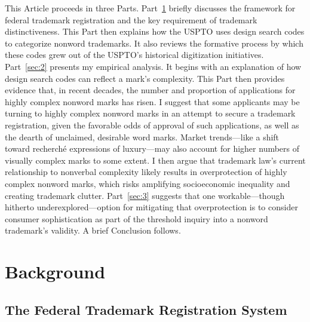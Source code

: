 \documentclass[letterpaper, 11pt, oneside]{article}
\begin{document}
This Article proceeds in three Parts. Part~\ref{sec:1} briefly discusses the framework for federal trademark registration and the key requirement of trademark distinctiveness. This Part then explains how the USPTO uses design search codes to categorize nonword trademarks. It also reviews the formative process by which these codes grew out of the USPTO's historical digitization initiatives. Part~\ref{sec:2} presents my empirical analysis. It begins with an explanation of how design search codes can reflect a mark's complexity. This Part then provides evidence that, in recent decades, the number and proportion of applications for highly complex nonword marks has risen. I suggest that some applicants may be turning to highly complex nonword marks in an attempt to secure a trademark registration, given the favorable odds of approval of such applications, as well as the dearth of unclaimed, desirable word marks. Market trends—like a shift toward recherché expressions of luxury—may also account for higher numbers of visually complex marks to some extent. I then argue that trademark law's current relationship to nonverbal complexity likely results in overprotection of highly complex nonword marks, which risks amplifying socioeconomic inequality and creating trademark clutter. Part~\ref{sec:3} suggests that one workable—though hitherto underexplored—option for mitigating that overprotection is to consider consumer sophistication as part of the threshold inquiry into a nonword trademark's validity. A brief Conclusion follows.

\newpage

\section{Background}\label{sec:1}

\subsection{The Federal Trademark Registration System}\label{subsec:1A}
\end{document}
